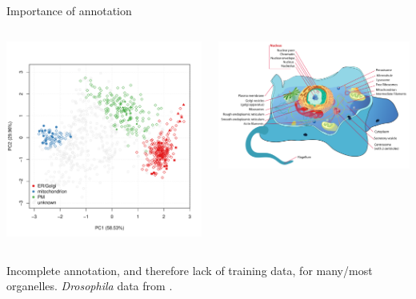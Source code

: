 \documentclass{beamer}
\theoremstyle{example}
\begin{document}
\begin{frame}{Importance of annotation}

  \begin{columns}[t]
    \begin{column}[T]{0.43\textwidth}
      \begin{centering}
        \includegraphics[width=1\linewidth]{figs/tan2009r1org.pdf}
      \end{centering}
    \end{column}
    \begin{column}[T]{0.56\textwidth}
      \includegraphics[width=1\linewidth]{figs/Animal_cell_structure.png}
    \end{column}
  \end{columns}
  Incomplete annotation, and therefore lack of training data, for
  many/most organelles. \textit{Drosophila} data from \cite{Tan2009}.
\end{frame}
\end{document}
